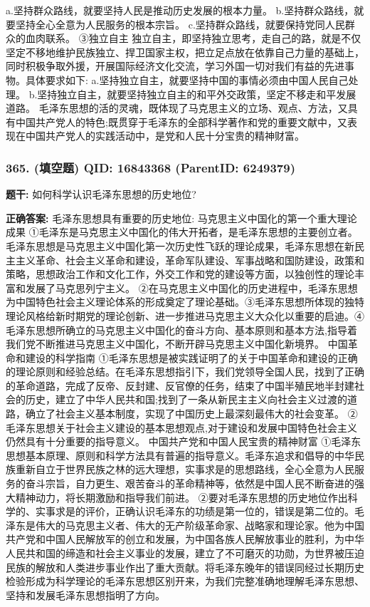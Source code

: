\documentclass[12pt,UTF8]{ctexart}
\begin{document}
a.坚持群众路线，就要坚持人民是推动历史发展的根本力量。
b.坚持群众路线，就要坚持全心全意为人民服务的根本宗旨。
c.坚持群众路线，就要保持党同人民群众的血肉联系。
③独立自主
独立自主，即坚持独立思考，走自己的路，就是不仅坚定不移地维护民族独立、捍卫国家主权，把立足点放在依靠自己力量的基础上，同时积极争取外援，开展国际经济文化交流，学习外国一切对我们有益的先进事物。具体要求如下:
a.坚持独立自主，就要坚持中国的事情必须由中国人民自己处理。
b.坚持独立自主，就要坚持独立自主的和平外交政策，坚定不移走和平发展道路。
毛泽东思想的活的灵魂，既体现了马克思主义的立场、观点、方法，又具有中国共产党人的特色;既贯穿于毛泽东的全部科学著作和党的重要文献中，又表现在中国共产党人的实践活动中，是党和人民十分宝贵的精神财富。

\vspace{0.3em}\hrulefill\vspace{0.7em}

\subsubsection*{365. (填空题) \small QID: 16843368 (ParentID: 6249379)}

\textbf{题干:}
如何科学认识毛泽东思想的历史地位?



\textbf{正确答案:}
毛泽东思想具有重要的历史地位:
马克思主义中国化的第一个重大理论成果
①毛泽东是马克思主义中国化的伟大开拓者，是毛泽东思想的主要创立者。毛泽东思想是马克思主义中国化第一次历史性飞跃的理论成果，毛泽东思想在新民主主义革命、社会主义革命和建设，革命军队建设、军事战略和国防建设，政策和策略，思想政治工作和文化工作，外交工作和党的建设等方面，以独创性的理论丰富和发展了马克思列宁主义。
②在马克思主义中国化的历史进程中，毛泽东思想为中国特色社会主义理论体系的形成奠定了理论基础。③毛泽东思想所体现的独特理论风格给新时期党的理论创新、进一步推进马克思主义大众化以重要的启迪。④毛泽东思想所确立的马克思主义中国化的奋斗方向、基本原则和基本方法,指导着我们党不断推进马克思主义中国化，不断开辟马克思主义中国化新境界。
中国革命和建设的科学指南
①毛泽东思想是被实践证明了的关于中国革命和建设的正确的理论原则和经验总结。在毛泽东思想指引下，我们党领导全国人民，找到了正确的革命道路，完成了反帝、反封建、反官僚的任务，结束了中国半殖民地半封建社会的历史，建立了中华人民共和国;找到了一条从新民主主义向社会主义过渡的道路，确立了社会主义基本制度，实现了中国历史上最深刻最伟大的社会变革。
②毛泽东思想关于社会主义建设的基本思想观点,对于建设和发展中国特色社会主义仍然具有十分重要的指导意义。
中国共产党和中国人民宝贵的精神财富
①毛泽东思想基本原理、原则和科学方法具有普遍的指导意义。毛泽东追求和倡导的中华民族重新自立于世界民族之林的远大理想，实事求是的思想路线，全心全意为人民服务的奋斗宗旨，自力更生、艰苦奋斗的革命精神等，依然是中国人民不断奋进的强大精神动力，将长期激励和指导我们前进。
②要对毛泽东思想的历史地位作出科学的、实事求是的评价，正确认识毛泽东的功绩是第一位的，错误是第二位的。毛泽东是伟大的马克思主义者、伟大的无产阶级革命家、战略家和理论家。他为中国共产党和中国人民解放军的创立和发展，为中国各族人民解放事业的胜利，为中华人民共和国的缔造和社会主义事业的发展，建立了不可磨灭的功勋，为世界被压迫民族的解放和人类进步事业作出了重大贡献。将毛泽东晚年的错误同经过长期历史检验形成为科学理论的毛泽东思想区别开来，为我们完整准确地理解毛泽东思想、坚持和发展毛泽东思想指明了方向。
\end{document}
